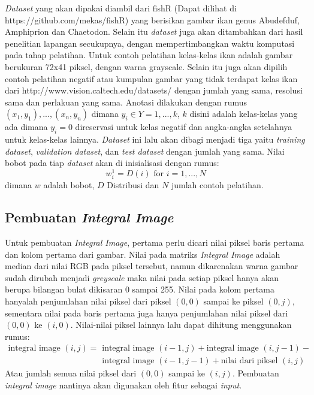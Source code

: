 \textit{Dataset} yang akan dipakai diambil dari fishR (Dapat dilihat di https://github.com/mekas/fishR) yang 
berisikan gambar ikan genus Abudefduf, Amphiprion dan Chaetodon. Selain itu 
\textit{dataset} juga akan ditambahkan dari hasil penelitian lapangan 
secukupnya, dengan mempertimbangkan waktu komputasi pada tahap 
pelatihan.
Untuk contoh pelatihan kelas-kelas ikan adalah gambar berukuran 72x41 piksel, 
dengan warna grayscale. Selain itu juga akan dipilih contoh 
pelatihan negatif atau kumpulan gambar yang tidak terdapat kelas 
ikan dari http://www.vision.caltech.edu/datasets/ dengan jumlah yang sama, resolusi sama dan perlakuan 
yang sama. Anotasi dilakukan dengan rumus $(x_1, y_1),...,(x_n, y_n)$ dimana 
$y_i \in Y = {1,...,k}$, $k$ disini adalah kelas-kelas yang ada dimana $y_i = 0$ 
direservasi untuk kelas negatif dan angka-angka setelahnya untuk kelas-kelas lainnya.
\textit{Dataset} ini lalu 
akan dibagi menjadi tiga yaitu \textit{training dataset}, 
\textit{validation dataset}, dan \emph{test dataset} dengan jumlah yang sama.
Nilai bobot pada tiap \textit{dataset} akan di inisialisasi dengan rumus:
\begin{equation}
  w^1_i = D(i) \text{ for } i=1,...,N
\end{equation}
dimana $w$ adalah bobot, $D$ Distribusi dan $N$ jumlah contoh pelatihan.

\subsection{Pembuatan \textit{Integral Image}}

Untuk pembuatan \emph{Integral Image}, pertama perlu dicari nilai piksel
baris pertama dan kolom pertama dari gambar. Nilai pada matriks \emph{Integral Image} 
adalah median dari nilai RGB pada piksel tersebut, namun dikarenakan warna 
gambar sudah dirubah menjadi \emph{greyscale} maka nilai pada setiap piksel 
hanya akan berupa bilangan bulat dikisaran 0 sampai 255. Nilai pada kolom 
pertama hanyalah penjumlahan nilai piksel dari piksel $(0, 0)$ sampai ke piksel 
$(0, j)$, sementara nilai pada baris pertama juga hanya penjumlahan nilai 
piksel dari $(0, 0)$ ke  $(i, 0)$. Nilai-nilai piksel lainnya lalu dapat 
dihitung menggunakan rumus: 
\begin{equation}
  \begin{split}
    \text{integral image } (i,j) = {} & \text{integral image } (i-1,j) + \text{integral image } (i,j-1) - \\
    & \text{integral image } (i-1,j-1) + \text{nilai dari piksel } (i,j)
  \end{split}
\end{equation}
Atau jumlah semua nilai piksel dari $(0, 0)$ sampai ke $(i, j)$.
Pembuatan \emph{integral image} nantinya akan digunakan oleh fitur sebagai \textit{input}.

